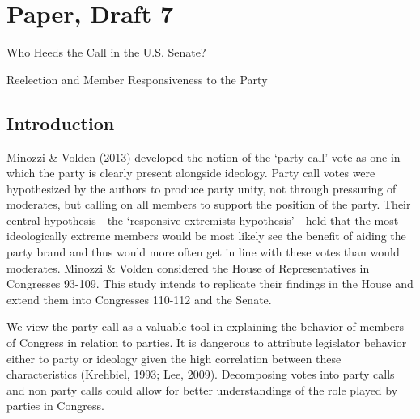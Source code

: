 \documentclass[12pt]{article}
\begin{document}
\doublespacing

\section{Paper, Draft 7}

\begin{center}
	{\Large Who Heeds the Call in the U.S. Senate?}
	
	{\large Reelection and Member Responsiveness to the Party}
\end{center}

\begin{abstract}
	\singlespacing
	\noindent
	In this paper, we replicate the findings of Minozzi \& Volden (2013) with some modifications of their methodology. We show that their hypotheses regarding party unity coming through the party working to unite more extreme (rather than more moderate) members holds not only in the House, but also the Senate. Further, we show the usefulness of separating votes in this way by considering changes in member behavior when they are up for reelection.
\end{abstract}



\subsection{Introduction}

Minozzi \& Volden (2013) developed the notion of the `party call' vote as one in which the party is clearly present alongside ideology. Party call votes were hypothesized by the authors to produce party unity, not through pressuring of moderates, but calling on all members to support the position of the party. Their central hypothesis - the `responsive extremists hypothesis' - held that the most ideologically extreme members would be most likely see the benefit of aiding the party brand and thus would more often get in line with these votes than would moderates. Minozzi \& Volden considered the House of Representatives in Congresses 93-109. This study intends to replicate their findings in the House and extend them into Congresses 110-112 and the Senate. 

We view the party call as a valuable tool in explaining the behavior of members of Congress in relation to parties. It is dangerous to attribute legislator behavior either to party or ideology given the high correlation between these characteristics (Krehbiel, 1993; Lee, 2009). Decomposing votes into party calls and non party calls could allow for better understandings of the role played by parties in Congress.
\end{document}
